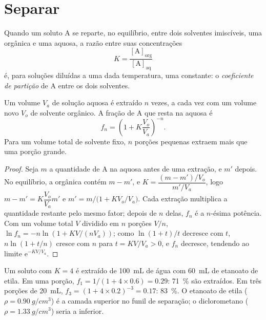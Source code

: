\section{Separar}

\begin{definition}\label{def:b1:lab-techniques-1:partition-coefficient}
Quando um soluto A se reparte, no equilíbrio, entre dois solventes
imiscíveis, uma  orgânica e uma  aquosa, a razão entre suas
concentrações
\[
  K = \frac{[\mathrm{A}]_{\mathrm{org}}}{[\mathrm{A}]_{\mathrm{aq}}}
\]
é, para soluções diluídas a uma dada temperatura, uma constante: o
\emph{coeficiente de partição} de A entre os
dois solventes.
\end{definition}

\begin{proposition}\label{prop:b1:lab-techniques-1:multiple-extractions}
Um volume $V_a$ de solução aquosa é extraído $n$ vezes, a cada vez com um
volume novo $V_o$ de solvente orgânico. A fração de A que resta na 
aquosa é
\[
  f_n = \left(1 + K \frac{V_o}{V_a}\right)^{-n}.
\]
Para um volume total de solvente fixo, $n$ porções pequenas extraem mais
que uma porção grande.
\end{proposition}
\begin{proof}
Seja $m$ a quantidade de A na  aquosa antes de uma extração, e $m'$
depois. No equilíbrio, a  orgânica contém $m - m'$, e
$K = \dfrac{(m - m')/V_o}{m'/V_a}$, logo $m - m' = K\dfrac{V_o}{V_a} m'$ e
$m' = m\big/\bigl(1 + K V_o/V_a\bigr)$. Cada extração multiplica a
quantidade restante pelo mesmo fator; depois de $n$ delas, $f_n$ é a
$n$-ésima potência. Com um volume total $V$ dividido em $n$ porções $V/n$,
$\ln f_n = -n \ln(1 + KV/(nV_a))$; como $\ln(1+t)/t$ decresce com $t$,
$n \ln(1 + t/n)$ cresce com $n$ para $t = KV/V_a > 0$, e $f_n$
decresce, tendendo ao limite $\mathrm{e}^{-KV/V_a}$.
\end{proof}

\begin{example}
Um soluto com $K = 4$ é extraído de \qty{100}{mL} de água com
\qty{60}{mL} de etanoato de etila. Em uma porção,
$f_1 = 1/(1 + 4 \times 0.6) = 0.29$: \qty{71}{\percent} são extraídos. Em
três porções de \qty{20}{mL}, $f_3 = (1 + 4 \times 0.2)^{-3} = 0.17$:
\qty{83}{\percent}. O etanoato de etila ($\rho = \qty{0.90}{g/cm^3}$) é a
camada superior no funil de separação; o diclorometano
($\rho = \qty{1.33}{g/cm^3}$) seria a inferior.
\end{example}

